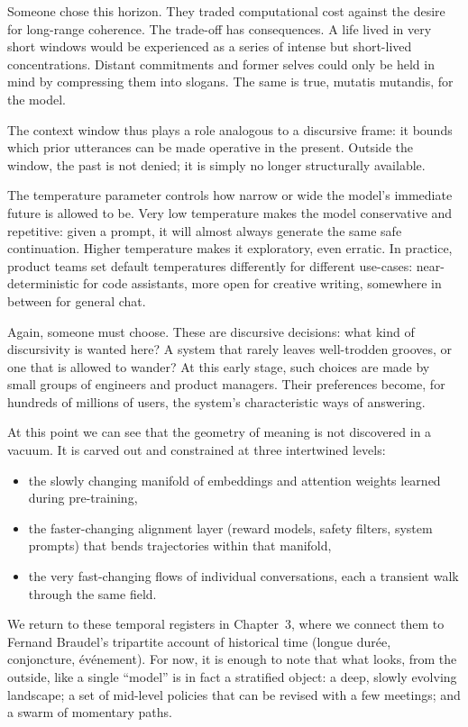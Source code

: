 \documentclass[12pt,a4paper]{report}
\begin{document}
Someone chose this horizon. They traded computational cost against the desire for long-range coherence. The trade-off has consequences. A life lived in very short windows would be experienced as a series of intense but short-lived concentrations. Distant commitments and former selves could only be held in mind by compressing them into slogans. The same is true, mutatis mutandis, for the model.

The context window thus plays a role analogous to a discursive frame: it bounds which prior utterances can be made operative in the present. Outside the window, the past is not denied; it is simply no longer structurally available.

The temperature parameter controls how narrow or wide the model's immediate future is allowed to be. Very low temperature makes the model conservative and repetitive: given a prompt, it will almost always generate the same safe continuation. Higher temperature makes it exploratory, even erratic. In practice, product teams set default temperatures differently for different use-cases: near-deterministic for code assistants, more open for creative writing, somewhere in between for general chat.

Again, someone must choose. These are discursive decisions: what kind of discursivity is wanted here? A system that rarely leaves well-trodden grooves, or one that is allowed to wander? At this early stage, such choices are made by small groups of engineers and product managers. Their preferences become, for hundreds of millions of users, the system's characteristic ways of answering.

At this point we can see that the geometry of meaning is not discovered in a vacuum. It is carved out and constrained at three intertwined levels:

\begin{itemize}
  \item the slowly changing manifold of embeddings and attention weights learned during pre-training,
  \item the faster-changing alignment layer (reward models, safety filters, system prompts) that bends trajectories within that manifold,
  \item the very fast-changing flows of individual conversations, each a transient walk through the same field.
\end{itemize}

We return to these temporal registers in Chapter~3, where we connect them to Fernand Braudel's tripartite account of historical time (longue dur\'ee, conjoncture, \'ev\'enement). For now, it is enough to note that what looks, from the outside, like a single ``model'' is in fact a stratified object: a deep, slowly evolving landscape; a set of mid-level policies that can be revised with a few meetings; and a swarm of momentary paths.
\end{document}
